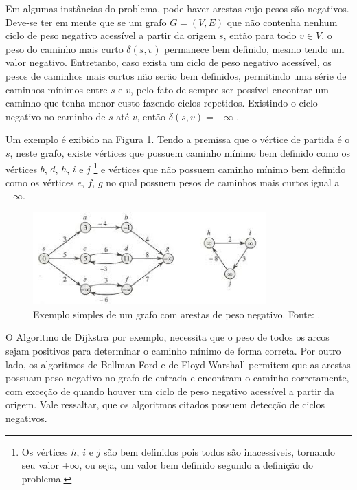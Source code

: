 \documentclass[12pt]{article}
\begin{document}
Em algumas instâncias do problema, pode haver arestas cujo pesos são negativos. Deve-se ter em mente que se um grafo $G = (V,E)$ que não contenha nenhum ciclo de peso negativo acessível a partir da origem $s$, então para todo $v \in V$, o peso do caminho mais curto $\delta(s,v)$ permanece bem definido, mesmo tendo um valor negativo. Entretanto, caso exista um ciclo de peso negativo acessível, os pesos de caminhos mais curtos não serão bem definidos, permitindo uma série de caminhos mínimos entre $s$ e $v$, pelo fato de sempre ser possível encontrar um caminho que tenha menor custo fazendo ciclos repetidos. Existindo o ciclo negativo no caminho de $s$ até $v$, então $\delta(s,v) = - \infty$ \cite{cormen2002algoritmos}.

Um exemplo é exibido na Figura \ref{fig:negativo}. Tendo a premissa que o vértice de partida é o $s$, neste grafo, existe vértices que possuem caminho mínimo bem definido como os vértices $b$, $d$, $h$, $i$ e $j$ \footnote{Os vértices $h$, $i$ e $j$ são bem definidos pois todos são inacessíveis, tornando seu valor $+\infty$, ou seja, um valor bem definido segundo a definição do problema.} e vértices que não possuem caminho mínimo bem definido como os vértices $e$, $f$, $g$ no qual possuem pesos de caminhos mais curtos igual a $-\infty$.

\begin{figure}[H]
  \centering
    \includegraphics[width=0.8\textwidth]{img/negativo2.jpeg}
  \caption{Exemplo simples de um grafo com arestas de peso negativo. Fonte: \cite{cormen2002algoritmos}.}
  \label{fig:negativo}
\end{figure}

O Algoritmo de Dijkstra por exemplo, necessita que o peso de todos os arcos sejam positivos para determinar o caminho mínimo de forma correta. Por outro lado, os algoritmos de Bellman-Ford e de Floyd-Warshall permitem que as arestas possuam peso negativo no grafo de entrada e encontram o caminho corretamente, com exceção de quando houver um ciclo de peso negativo acessível a partir da origem. Vale ressaltar, que os algoritmos citados possuem detecção de ciclos negativos. 
\end{document}
